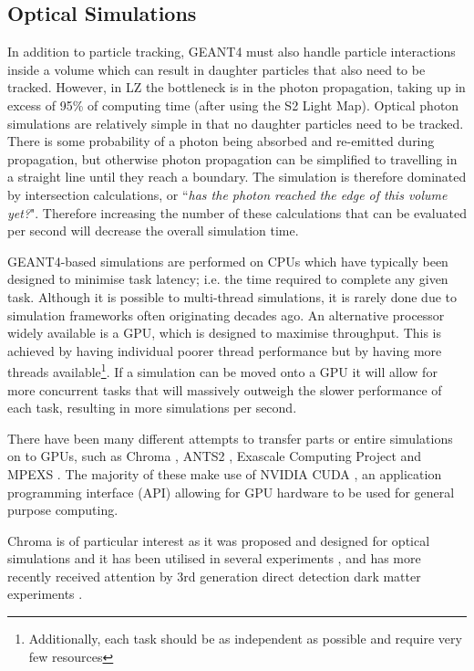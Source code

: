 \subsection{Optical Simulations}
\par
In addition to particle tracking, GEANT4 must also handle particle interactions inside a volume which can result in daughter particles that also need to be tracked.
However, in LZ the bottleneck is in the photon propagation, taking up in excess of 95\% of computing time (after using the S2 Light Map).
Optical photon simulations are relatively simple in that no daughter particles need to be tracked.
There is some probability of a photon being absorbed and re-emitted during propagation, but otherwise photon propagation can be simplified to travelling in a straight line until they reach a boundary.
The simulation is therefore dominated by intersection calculations, or ``\textit{has the photon reached the edge of this volume yet?}".
Therefore increasing the number of these calculations that can be evaluated per second will decrease the overall simulation time.
\par
GEANT4-based simulations are performed on CPUs which have typically been designed to minimise task latency; i.e. the time required to complete any given task.
Although it is possible to multi-thread simulations, it is rarely done due to simulation frameworks often originating decades ago.
An alternative processor widely available is a GPU, which is designed to maximise throughput.
This is achieved by having individual poorer thread performance but by having more threads available\footnote{Additionally, each task should be as independent as possible and require very few resources}.
If a simulation can be moved onto a GPU it will allow for more concurrent tasks that will massively outweigh the slower performance of each task, resulting in more simulations per second.
\par
There have been many different attempts to transfer parts or entire simulations on to GPUs, such as Chroma \cite{chroma_whitepaper_ref}, ANTS2 \cite{ants2_whitepaper_ref}, Exascale Computing Project \cite{ExaSMR_whitepaper_ref} and MPEXS \cite{mpexs_whitepaper_ref}.
The majority of these make use of NVIDIA CUDA \cite{cuda_ref}, an application programming interface (API) allowing for GPU hardware to be used for general purpose computing.
\par
Chroma is of particular interest as it was proposed and designed for optical simulations and it has been utilised in several experiments \cite{chroma_with_tpcs1_ref,chroma_with_tpcs2_ref,chroma_with_tpcs3_ref}, and has more recently received attention by 3rd generation direct detection dark matter experiments \cite{DARWIN_GPU_simulations_2022_ref}.

